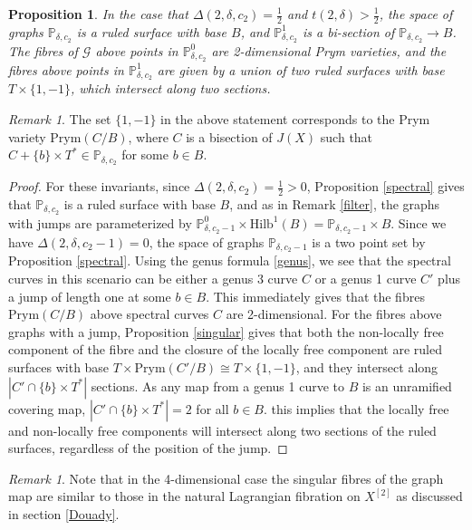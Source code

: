 \documentclass{article}[12pt]
\newtheorem{proposition}[theorem]{Proposition}
\theoremstyle{definition}
\theoremstyle{remark}
\newtheorem{remark}[theorem]{Remark}
\numberwithin{equation}{section}
\newcommand \mc{\mathcal}
\newcommand \mb{\mathbb}
\begin{document}
\begin{proposition}\label{4dim}
	In the case that $\Delta(2,\delta,c_2)=\frac{1}{2}$ and $t(2,\delta)>\frac{1}{2}$, the space of graphs $\mb{P}_{\delta,c_2}$ is a ruled surface with base $B$, and $\mb{P}_{\delta,c_2}^1$ is a bi-section of $\mb{P}_{\delta,c_2}\to B$. The fibres of $\mc{G}$ above points in $\mb{P}^0_{\delta,c_2}$ are 2-dimensional Prym varieties, and the fibres above points in $\mb{P}_{\delta,c_2}^1$ are given by a union of two ruled surfaces with base $T\times \{1,-1\}$, which intersect along two sections. 
\end{proposition}
\begin{remark}
	The set $\{1,-1\}$ in the above statement corresponds to the Prym variety $\text{Prym}(C/B)$, where $C$ is a bisection of $J(X)$ such that $C+\{b\}\times T^*\in \mb{P}_{\delta,c_2}$ for some $b \in B$.
\end{remark}
\begin{proof}
	For these invariants, since $\Delta(2,\delta,c_2)=\frac{1}{2}>0$, Proposition \ref{spectral} gives that $\mb{P}_{\delta,c_2}$ is a ruled surface with base $B$, and as in Remark \ref{filter}, the graphs with jumps are parameterized by $\mb{P}^0_{\delta,c_2-1}\times \text{Hilb}^1(B)=\mb{P}_{\delta,c_2-1}\times B$. Since we have $\Delta(2,\delta,c_2-1)=0$, the space of graphs $\mb{P}_{\delta,c_2-1}$ is a two point set by Proposition \ref{spectral}.  Using the genus formula \eqref{genus}, we see that the spectral curves in this scenario can be either a genus 3 curve $C$ or a genus 1 curve $C'$ plus a jump of length one at some $b \in B$. This immediately gives that the fibres $\text{Prym}(C/B)$ above spectral curves $C$ are 2-dimensional. For the fibres above graphs with a jump, Proposition \ref{singular} gives that both the non-locally free component of the fibre and the closure of the locally free component are ruled surfaces with base $T\times \text{Prym}(C'/B)\cong T\times \{1,-1\}$, and they intersect along $|C'\cap \{b\}\times T^*|$ sections. As any map from a genus 1 curve to $B$ is an unramified covering map, $|C'\cap \{b\}\times T^*|=2$ for all $b \in B$. this implies that the locally free and non-locally free components will intersect along two sections of the ruled surfaces, regardless of the position of the jump. 
\end{proof}
\begin{remark}
Note that in the 4-dimensional case the singular fibres of the graph map are similar to those in the natural Lagrangian fibration on $X^{[2]}$ as discussed in section \ref{Douady}.    
\end{remark}
\end{document}
